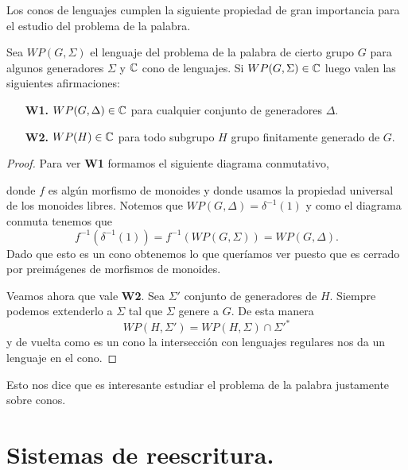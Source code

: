 \documentclass[tesis.tex]{subfiles}
\newcommand{\fg}{grupo finitamente generado }
\begin{document}
Los conos de lenguajes cumplen la siguiente propiedad de gran importancia para el estudio del problema de la palabra.
\medskip
\begin{prop}\label{prop-cono-wp}
	Sea $WP(G, \Sigma)$ el lenguaje del problema de la palabra de cierto grupo $G$ para algunos generadores $\Sigma$ y $\mathbb{C}$ cono de lenguajes. 
	Si $WP(G, \Sigma) \in \mathbb{C}$ luego valen las siguientes afirmaciones:
	\begin{itemize}
		\item[\textbf{W1.}] $WP(G, \Delta) \in \mathbb{C}$ para cualquier conjunto de generadores $\Delta$.
		\item[\textbf{W2.}] $WP(H) \in \mathbb{C}$ para todo subgrupo $H$ \fg de $G$.
	\end{itemize} 
\end{prop}
\begin{proof}
		Para ver \textbf{W1} formamos el siguiente diagrama conmutativo,
		\begin{center}
		\end{center}
		donde $f$ es algún morfismo de monoides y donde usamos la propiedad universal de los monoides libres.
		Notemos que $WP(G, \Delta) = \delta^{-1}(1)$ y como el diagrama conmuta tenemos que 
		\[
		f^{-1}(\delta^{-1}(1)) = f^{-1}(WP(G,\Sigma)) = WP(G, \Delta).
		\]
		Dado que esto es un cono obtenemos lo que queríamos ver puesto que es cerrado por preimágenes de morfismos de monoides.
		
		
		
		Veamos ahora que vale \textbf{W2}. 
		Sea $\Sigma'$ conjunto de generadores de $H$.
		Siempre podemos extenderlo a $\Sigma$ tal que $\Sigma$ genere a $G$. 
		De esta manera 
		\[
		WP(H, \Sigma') = WP(H, \Sigma) \cap \Sigma'^*
		\]
		y de vuelta como es un cono la intersección con lenguajes regulares nos da un lenguaje en el cono. 

\end{proof}


Esto nos dice que es interesante estudiar el problema de la palabra justamente sobre conos.


\section{Sistemas de reescritura.}
\end{document}
